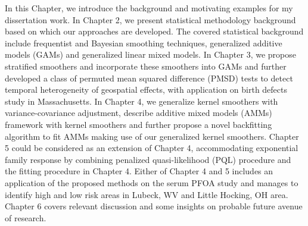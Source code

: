In this Chapter, we introduce the background and motivating examples for my dissertation work. In Chapter 2, we present statistical methodology background based on which our approaches are developed. The covered statistical background include frequentist and Bayesian smoothing techniques, generalized additive models (GAMs) and generalized linear mixed models. In Chapter 3, we propose stratified smoothers and incorporate these smoothers into GAMs and further developed a class of permuted mean squared difference (PMSD) tests to detect temporal heterogeneity of geospatial effects, with application on birth defects study in Massachusetts. In Chapter 4, we generalize kernel smoothers with variance-covariance adjustment, describe additive mixed models (AMMs) framework with kernel smoothers and further propose a novel backfitting algorithm to fit AMMs making use of our generalized kernel smoothers. Chapter 5 could be considered as an extension of Chapter 4, accommodating exponential family response by combining penalized quasi-likelihood (PQL) procedure and the fitting procedure in Chapter 4. Either of Chapter 4 and 5 includes an application of the proposed methods on the serum PFOA study and manages to identify high and low risk areas in Lubeck, WV and Little Hocking, OH area. Chapter 6 covers relevant discussion and some insights on probable future avenue of research.

